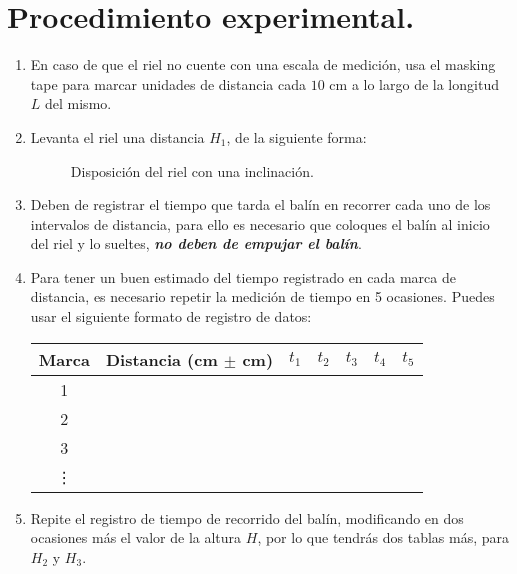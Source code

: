 \section{Procedimiento experimental.}
\begin{enumerate}
\item En caso de que el riel no cuente con una escala de medición, usa el masking tape para marcar unidades de distancia cada $10$ cm a lo largo de la longitud $L$ del mismo.
\item Levanta el riel una distancia $H_{1}$, de la siguiente forma:
\begin{figure}[H]
	\centering
	
	\caption{Disposición del riel con una inclinación.}
\end{figure}
\item Deben de registrar el tiempo que tarda el balín en recorrer cada uno de los intervalos de distancia, para ello es necesario que coloques el balín al inicio del riel y lo sueltes, \textbf{\emph{no deben de empujar el balín}}.
\item Para tener un buen estimado del tiempo registrado en cada marca de distancia, es necesario repetir la medición de tiempo en 5 ocasiones. Puedes usar el siguiente formato de registro de datos:
\begin{center}
\begin{tabular}{| c | c *{5} {| C{1cm} } |}
\hline
Marca & Distancia (cm $\pm$ cm) & $t_{1}$ & $t_{2}$ & $t_{3}$ & $t_{4}$ & $t_{5}$ \\  & & & & & & \\  & & & & & &  \\  & & & & & &  \\ \hline
\vdots & & & & & &  \\ \hline
\end{tabular}
\end{center}
\item Repite el registro de tiempo de recorrido del balín, modificando en dos ocasiones más el valor de la altura $H$, por lo que tendrás dos tablas más, para $H_{2}$ y $H_{3}$.
\end{enumerate}
